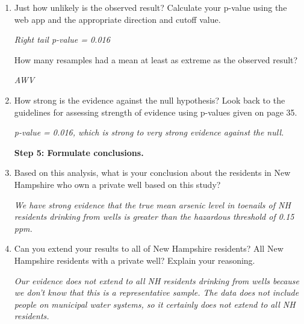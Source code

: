 \begin{enumerate}
\item \label{pval13}Just how unlikely is the observed result?  Calculate your
  p-value using the web app and the appropriate direction and cutoff value.
\begin{students}
  \vspace{1cm}
\end{students}

\begin{key}
  {\it Right tail p-value = 0.016}
\end{key}

 How many  resamples had a mean at least as extreme as the
 observed result?  
\begin{students}
  \vspace{1cm}
\end{students}

\begin{key}
  {\it AWV}
\end{key}

\item How strong is the evidence against the null hypothesis?  Look back to
  the guidelines for assessing strength of evidence using p-values
  given on page 35.
\begin{students}
  \vspace{1cm}
\end{students}

\begin{key}
  {\it p-value = 0.016, which is strong to very strong evidence
    against the null.}
\end{key}
 

{\bf Step 5: Formulate conclusions.}


\item Based on this analysis, what is your conclusion about the
  residents in New Hampshire who own a private well based on this
  study?
\begin{students}
  \vspace{2cm}
\end{students}

\begin{key}
  {\it We have strong evidence that the true mean arsenic level in
    toenails of NH residents drinking from wells is greater than the
    hazardous threshold of 0.15 ppm.} 
\end{key}
\item Can you extend your results to all of New Hampshire residents?
  All New Hampshire residents with a private well?  Explain your
  reasoning.
\begin{students}
  \vspace{4cm}
\end{students}

\begin{key}
  {\it Our evidence does not extend to all NH residents drinking from
    wells because we don't know that this is a representative sample.
   The data does not include people on municipal water systems, so it
   certainly does not extend to all NH residents.} 
\end{key}

\end{enumerate}

